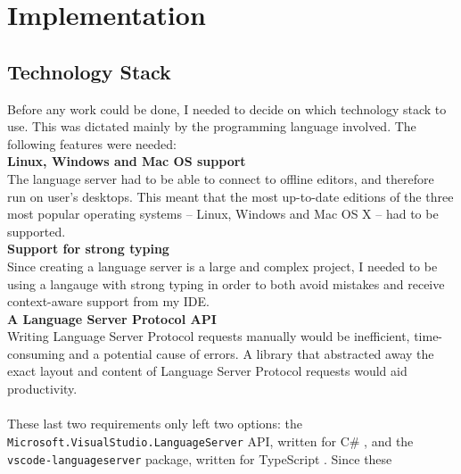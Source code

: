 \documentclass[../main.tex]{subfiles}
\begin{document}
\chapter{Implementation}
\section{Technology Stack}
Before any work could be done, I needed to decide on which technology stack to use. This was dictated mainly by the programming language involved. The following features were needed:
\\
\textbf{Linux, Windows and Mac OS support} \\
The language server had to be able to connect to offline editors, and therefore run on user's desktops. This meant that the most up-to-date editions of the three most popular operating systems -- Linux, Windows and Mac OS X -- had to be supported.
\\
\textbf{Support for strong typing} \\
Since creating a language server is a large and complex project, I needed to be using a langauge with strong typing in order to both avoid mistakes and receive context-aware support from my IDE.
\\
\textbf{A Language Server Protocol API} \\
Writing Language Server Protocol requests manually would be inefficient, time-consuming and a potential cause of errors. A library that abstracted away the exact layout and content of Language Server Protocol requests would aid productivity.
\\ \\ 
These last two requirements only left two options: the \texttt{Microsoft.VisualStudio.LanguageServer} API, written for C\# \cite{visual_studio_language_server}, and the \texttt{vscode-languageserver} package, written for TypeScript \cite{vsc_langserver_docs}. Since these 
\end{document}
